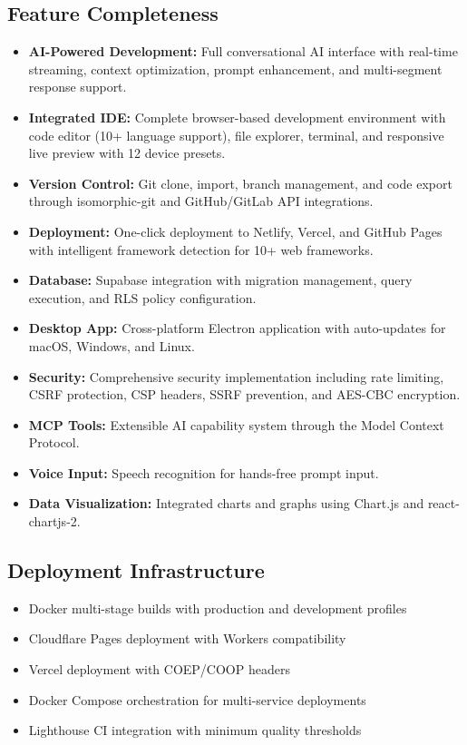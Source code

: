 \documentclass[12pt,a4paper,openany]{report}
\begin{document}
\subsection{Feature Completeness}
\begin{itemize}
    \item \textbf{AI-Powered Development:} Full conversational AI interface with real-time streaming, context optimization, prompt enhancement, and multi-segment response support.
    \item \textbf{Integrated IDE:} Complete browser-based development environment with code editor (10+ language support), file explorer, terminal, and responsive live preview with 12 device presets.
    \item \textbf{Version Control:} Git clone, import, branch management, and code export through isomorphic-git and GitHub/GitLab API integrations.
    \item \textbf{Deployment:} One-click deployment to Netlify, Vercel, and GitHub Pages with intelligent framework detection for 10+ web frameworks.
    \item \textbf{Database:} Supabase integration with migration management, query execution, and RLS policy configuration.
    \item \textbf{Desktop App:} Cross-platform Electron application with auto-updates for macOS, Windows, and Linux.
    \item \textbf{Security:} Comprehensive security implementation including rate limiting, CSRF protection, CSP headers, SSRF prevention, and AES-CBC encryption.
    \item \textbf{MCP Tools:} Extensible AI capability system through the Model Context Protocol.
    \item \textbf{Voice Input:} Speech recognition for hands-free prompt input.
    \item \textbf{Data Visualization:} Integrated charts and graphs using Chart.js and react-chartjs-2.
\end{itemize}

\subsection{Deployment Infrastructure}
\begin{itemize}
    \item Docker multi-stage builds with production and development profiles
    \item Cloudflare Pages deployment with Workers compatibility
    \item Vercel deployment with COEP/COOP headers
    \item Docker Compose orchestration for multi-service deployments
    \item Lighthouse CI integration with minimum quality thresholds
\end{itemize}
\end{document}
